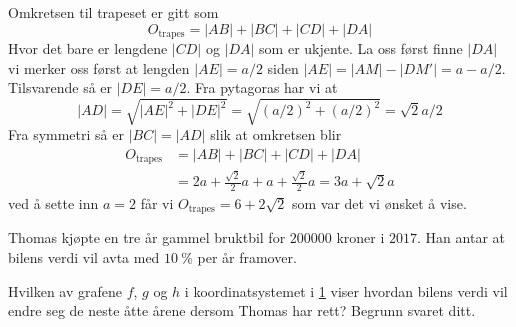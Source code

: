 \begin{losninger}
  Omkretsen til trapeset er gitt som
  \begin{equation}
    O_{\text{trapes}} = |AB| + |BC| + |CD| + |DA|
  \end{equation}
  Hvor det bare er lengdene $|CD|$ og $|DA|$ som er ukjente. La oss først
  finne $|DA|$ vi merker oss først at lengden $|AE| = a/2$ siden $|AE| = |AM|
  - |DM'| = a - a/2$.  Tilsvarende så er $|DE| = a/2$. Fra pytagoras har vi at
  \begin{equation}
    |AD|
    = \sqrt{|AE|^2 + |DE|^2}
    = \sqrt{(a/2)^2 + (a/2)^2}
    = \sqrt{2}a/2
  \end{equation}
  Fra symmetri så er $|BC|=|AD|$ slik at omkretsen blir
  \begin{align*}
    O_{\text{trapes}}
        & = |AB| + |BC| + |CD| + |DA| \\
        & =   2a  +   \frac{\sqrt{2}}{2}a + a + \frac{\sqrt{2}}{2}a
        =   3a  + \sqrt{2}a
  \end{align*}
  ved å sette inn $a=2$ får vi $O_{\text{trapes}} = 6 + 2 \sqrt{2}$ som var
  det vi ønsket å vise.
\end{losninger}


\Oppgave[2]

Thomas kjøpte en tre år gammel bruktbil for $\num{200000}$ kroner i $2017$. Han
antar at bilens verdi vil avta med  $\SI{10}{\percent}$ per år framover.

\begin{oppgaver}
   Hvilken av grafene $f$, $g$ og $h$ i koordinatsystemet i
    \cref{fig:del-1-oppgave-6} viser hvordan bilens verdi vil endre seg de neste
    åtte årene dersom Thomas har rett? Begrunn svaret ditt.
\end{oppgaver}

\begin{figure}[H]
  \caption{}
  \label{fig:del-1-oppgave-6}
\end{figure}

